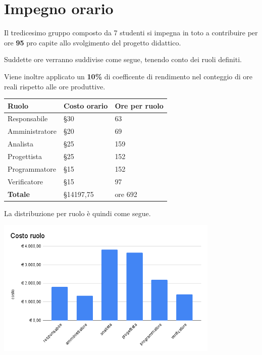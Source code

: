 \section{Impegno orario}

Il tredicesimo gruppo composto da 7 studenti si impegna in toto a contribuire per ore \textbf{95} pro capite allo svolgimento del progetto didattico.

Suddette ore verranno suddivise come segue, tenendo conto dei ruoli definiti.

Viene inoltre applicato un \textbf{10\%} di coefficente di rendimento nel conteggio di ore reali rispetto alle ore produttive.

\begin{center}
    \begin{tabularx}{10cm}{X |l|l}          
        \textbf{Ruolo} & \textbf{Costo orario} & \textbf{Ore per ruolo}\\
        \hline

        Responsabile & §30 & 63\\
        Amministratore & §20 & 69\\
        Analista & §25 & 159\\
        Progettista & §25 & 152\\
        Programmatore & §15 & 152\\
        Verificatore & §15 & 97\\
        \hline
        \textbf{Totale} & §14197,75 & ore 692
    \end{tabularx}
\end{center}

La distribuzione per ruolo è quindi come segue.

\begin{center}
\includegraphics[width=0.8\textwidth]{immagini/Costo ruolo.png}
\end{center}

